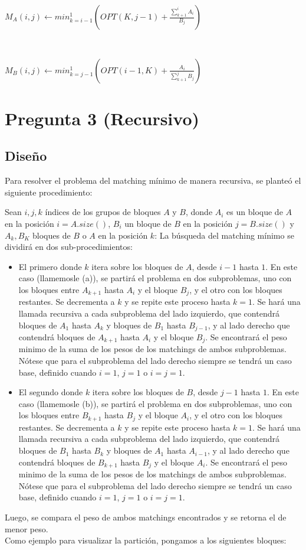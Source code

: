 \documentclass{article}
\begin{document}
\begin{algorithmic}
\STATE $M_A(i,j)\gets min^{1}_{k=i-1}(OPT(K,j-1)+\frac {\sum_{k+1}^{i}{A_{i}}}{B_j} )$
\end{algorithmic}
\\
\begin{algorithmic}
\STATE $M_B(i,j)\gets min^{1}_{k=j-1}(OPT(i-1,K)+\frac {A_i}{\sum_{k+1}^{j}{B_{j}}})$
\end{algorithmic}


\newpage
\section {Pregunta 3 (Recursivo)}
\subsection{Diseño}
Para resolver el problema del matching mínimo de manera recursiva, se planteó el siguiente procedimiento:

Sean $i, j, k$ índices de los grupos de bloques $A$ y $B$, donde $A_i$ es un bloque de $A$ en la posición $i = A.size ()$, $B_i$ un bloque de $B$ en la posición $j = B.size ()$ y $A_k, B_K$ bloques de $B$ o $A$ en la posición $k$: La búsqueda del matching mínimo se dividirá en dos sub-procedimientos:
\begin{itemize}
    \item El primero donde $k$ itera sobre los bloques de $A$, desde $i - 1$ hasta $1$. En este caso (llamemosle (a)), se partirá el problema en dos subproblemas, uno con los bloques entre $A_{k+1}$ hasta $A_i$ y el bloque $B_j$, y el otro con los bloques restantes. Se decrementa a $k$ y se repite este proceso hasta $k = 1$. Se hará una llamada recursiva a cada subproblema del lado izquierdo, que contendrá bloques de $A_1$ hasta $A_k$ y bloques de $B_1$ hasta $B_{j-1}$, y al lado derecho que contendrá bloques de $A_{k+1}$ hasta $A_i$ y el bloque $B_j$. Se encontrará el peso minimo de la suma de los pesos de los matchings de ambos subproblemas. Nótese que para el subproblema del lado derecho siempre se tendrá un caso base, definido cuando $i = 1$, $j = 1$ o $i = j = 1$.
    \item El segundo donde $k$ itera sobre los bloques de $B$, desde $j - 1$ hasta $1$. En este caso (llamemosle (b)), se partirá el problema en dos subproblemas, uno con los bloques entre $B_{k+1}$ hasta $B_j$ y el bloque $A_i$, y el otro con los bloques restantes. Se decrementa a $k$ y se repite este proceso hasta $k = 1$. Se hará una llamada recursiva a cada subproblema del lado izquierdo, que contendrá bloques de $B_1$ hasta $B_k$ y bloques de $A_1$ hasta $A_{i-1}$, y al lado derecho que contendrá bloques de $B_{k+1}$ hasta $B_j$ y el bloque $A_i$. Se encontrará el peso minimo de la suma de los pesos de los matchings de ambos subproblemas. Nótese que para el subproblema del lado derecho siempre se tendrá un caso base, definido cuando $i = 1$, $j = 1$ o $i = j = 1$.
\end{itemize}
Luego, se compara el peso de ambos matchings encontrados y se retorna el de menor peso.\\
\newpage
Como ejemplo para visualizar la partición, pongamos a los siguientes bloques:\\
\end{document}
